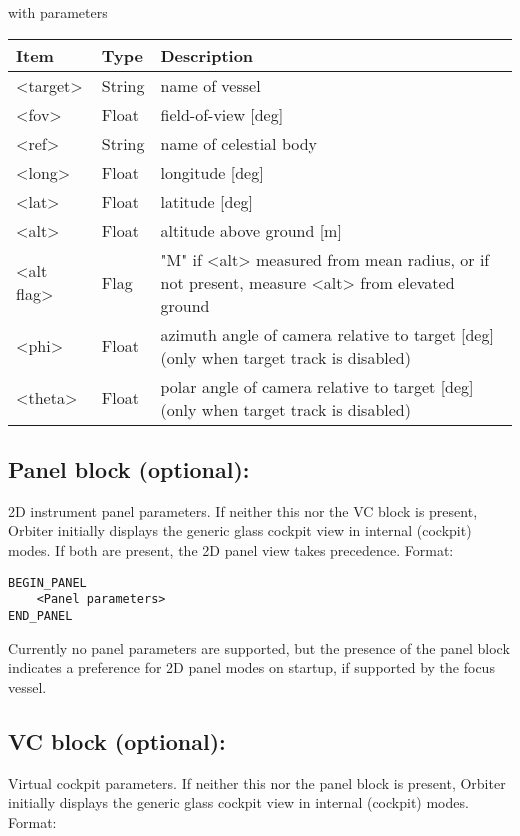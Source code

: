 \documentclass[Orbiter Developer Manual.tex]{subfiles}
\begin{document}
\noindent
with parameters

\begin{table}[H]
	\centering
	\begin{tabularx}{\textwidth}{ |l|l|X| }
	\hline\rule{0pt}{2ex}
	\textbf{Item} & \textbf{Type} & \textbf{Description}\\
	\hline\rule{0pt}{2ex}
	<target> & String & name of vessel\\
	\hline\rule{0pt}{2ex}
	<fov> & Float &field-of-view [deg]\\
	\hline\rule{0pt}{2ex}
	<ref> & String & name of celestial body\\
	\hline\rule{0pt}{2ex}
	<long> & Float & longitude [deg]\\
	\hline\rule{0pt}{2ex}
	<lat> & Float & latitude [deg]\\
	\hline\rule{0pt}{2ex}
	<alt> & Float & altitude above ground [m]\\
	\hline\rule{0pt}{2ex}
	<alt flag> & Flag & "M" if <alt> measured from mean radius, or if not present, measure <alt> from elevated ground\\
	\hline\rule{0pt}{2ex}
	<phi> & Float & azimuth angle of camera relative to target [deg] (only when target track is disabled)\\
	\hline\rule{0pt}{2ex}
	<theta> & Float & polar angle of camera relative to target [deg] (only when target track is disabled)\\
	\hline
	\end{tabularx}
\end{table}




\subsection*{Panel block (optional):}
2D instrument panel parameters. If neither this nor the VC block is present, Orbiter initially displays the generic glass cockpit view in internal (cockpit) modes. If both are present, the 2D panel view takes precedence. Format:

\begin{lstlisting}[language=OSFS]
BEGIN_PANEL
	<Panel parameters>
END_PANEL
\end{lstlisting}

\noindent
Currently no panel parameters are supported, but the presence of the panel block indicates a preference for 2D panel modes on startup, if supported by the focus vessel.


\subsection*{VC block (optional):}
Virtual cockpit parameters. If neither this nor the panel block is present, Orbiter initially displays the generic glass cockpit view in internal (cockpit) modes. Format:
\end{document}
